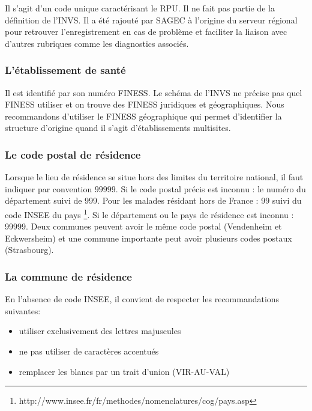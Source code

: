 \documentclass[12pt,english,french,twoside]{book}\usepackage[]{graphicx}\usepackage[]{color}
\begin{document}
Il s'agit d'un code unique caractérisant le RPU. Il ne fait pas partie de la définition de l'INVS. 
Il a été rajouté par SAGEC à l'origine du serveur régional pour retrouver l'enregistrement en cas de problème et faciliter la liaison avec d'autres rubriques comme les diagnostics associés.

\subsubsection{L'établissement de santé}

Il est identifié par son numéro FINESS. Le schéma de l'INVS ne précise pas quel FINESS utiliser et on trouve des FINESS juridiques et géographiques. Nous recommandons d'utiliser le FINESS géographique qui permet d'identifier la structure d'origine quand il s'agit d'établissements multisites.

\subsubsection{Le code postal de résidence}

Lorsque le lieu de résidence se situe hors des limites du territoire national, il faut indiquer par convention $99999$.
Si le code postal précis est inconnu : le numéro du département suivi de 999.
Pour les malades résidant hors de France : 99 suivi du code INSEE du pays \footnote{http://www.insee.fr/fr/methodes/nomenclatures/cog/pays.asp}.
Si le département ou le pays de résidence est inconnu : 99999.
Deux communes peuvent avoir le même code postal (Vendenheim et Eckwersheim) et une commune importante peut avoir plusieurs codes postaux (Strasbourg).

\subsubsection{La commune de résidence}

En l'absence de code INSEE, il convient de respecter les recommandations suivantes:
\begin{itemize}
  \item utiliser exclusivement des lettres majuscules
  \item ne pas utiliser de caractères accentués
  \item remplacer les blancs par un trait d'union (VIR-AU-VAL)
\end{itemize}
\end{document}
